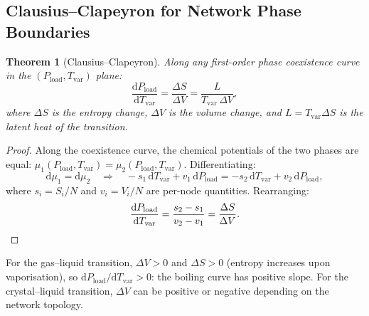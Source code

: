 \documentclass[11pt,twocolumn,a4paper]{article}
\newtheorem{theorem}{Theorem}[section]
\theoremstyle{definition}
\theoremstyle{remark}
\newcommand{\Tvar}{T_{\mathrm{var}}}
\newcommand{\Pload}{P_{\mathrm{load}}}
\newcommand{\dd}{\mathrm{d}}
\begin{document}
\subsection{Clausius--Clapeyron for Network Phase Boundaries}\label{sec:cc}

\begin{theorem}[Clausius--Clapeyron]\label{thm:cc}
Along any first-order phase coexistence curve in the $(\Pload,\Tvar)$ plane:
\begin{equation}\label{eq:cc}
  \frac{\dd\Pload}{\dd\Tvar} = \frac{\Delta S}{\Delta V}
  = \frac{L}{\Tvar\,\Delta V},
\end{equation}
where $\Delta S$ is the entropy change, $\Delta V$ is the volume change,
and $L=\Tvar\Delta S$ is the latent heat of the transition.
\end{theorem}

\begin{proof}
Along the coexistence curve, the chemical potentials of the two phases are
equal: $\mu_1(\Pload,\Tvar)=\mu_2(\Pload,\Tvar)$.  Differentiating:
\[
  \dd\mu_1 = \dd\mu_2
  \quad\Longrightarrow\quad
  -s_1\,\dd\Tvar+v_1\,\dd\Pload = -s_2\,\dd\Tvar+v_2\,\dd\Pload,
\]
where $s_i=S_i/N$ and $v_i=V_i/N$ are per-node quantities.  Rearranging:
\[
  \frac{\dd\Pload}{\dd\Tvar} = \frac{s_2-s_1}{v_2-v_1}
  = \frac{\Delta S}{\Delta V}.\qedhere
\]
\end{proof}

For the gas--liquid transition, $\Delta V>0$ and $\Delta S>0$
(entropy increases upon vaporisation), so $\dd\Pload/\dd\Tvar>0$: the
boiling curve has positive slope.  For the crystal--liquid transition,
$\Delta V$ can be positive or negative depending on the network topology.
\end{document}
